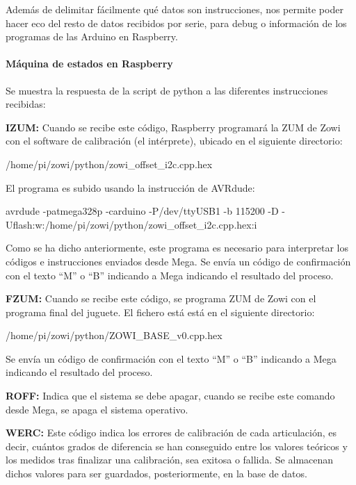 Además de delimitar fácilmente qué datos son instrucciones, nos permite poder hacer eco del resto de datos recibidos por serie, para debug o información de los programas de las Arduino en Raspberry.

\paragraph{Máquina de estados en Raspberry}

Se muestra la respuesta de la script de python a las diferentes instrucciones recibidas:

\textbf{IZUM:}
Cuando se recibe este código, Raspberry programará la ZUM de Zowi con el software de calibración (el intérprete), ubicado en el siguiente directorio:
\begin{center} /home/pi/zowi/python/zowi\_offset\_i2c.cpp.hex \end{center}

El programa es subido usando la instrucción de AVRdude:
\begin{center} avrdude -patmega328p -carduino -P/dev/ttyUSB1 -b 115200 -D -Uflash:w:/home/pi/zowi/python/zowi\_offset\_i2c.cpp.hex:i \end{center}

Como se ha dicho anteriormente, este programa es necesario para interpretar los códigos e instrucciones enviados desde Mega. Se envía un código de confirmación con el texto “M” o “B” indicando a Mega indicando el resultado del proceso.

\textbf{FZUM:}
Cuando se recibe este código, se programa ZUM de Zowi con el programa final del juguete. El fichero está está en el siguiente directorio:
\begin{center} /home/pi/zowi/python/ZOWI\_BASE\_v0.cpp.hex \end{center}

Se envía un código de confirmación con el texto “M” o “B” indicando a Mega indicando el resultado del proceso.

\textbf{ROFF:}
Indica que el sistema se debe apagar, cuando se recibe este comando desde Mega, se apaga el sistema operativo.

\textbf{WERC:}
Este código indica los errores de calibración de cada articulación, es decir, cuántos grados de diferencia se han conseguido entre los valores teóricos y los medidos tras finalizar una calibración, sea exitosa o fallida. Se almacenan dichos valores para ser guardados, posteriormente, en la base de datos.

